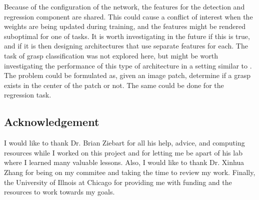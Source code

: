 \documentclass{article}
\begin{document}
Because of the configuration of the network, the features for the detection
and regression component are shared. This could cause a conflict of interest
when the weights are being updated during training, and the features might
be rendered suboptimal for one of tasks. It is worth investigating in the
future if this is true, and if it is then designing architectures that
use separate features for each. The task of grasp classification was
not explored here, but might be worth investigating the performance of
this type of architecture in a setting similar to \cite{saxena08a}. The
problem could be formulated as, given an image patch, determine if a
grasp exists in the center of the patch or not. The same could be done
for the regression task.

\subsection{Acknowledgement}
I would like to thank Dr. Brian Ziebart for all his help, advice,
and computing resources while I worked on this project and
for letting me be apart of his lab where I learned many valuable
lessons. Also,
I would like to thank Dr. Xinhua Zhang for being on my commitee
and taking the time to review my work. Finally, the
University of Illnois at Chicago for providing me with funding
and the resources to work towards my goals.
\end{document}
